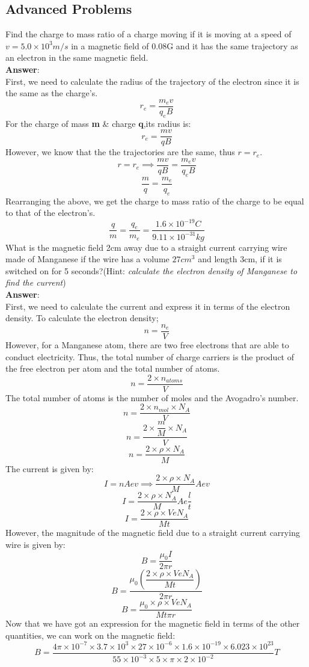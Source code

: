 \documentclass[9pt,addpoints]{exam}
\begin{document}
\begin{questions}
		\subsection*{Advanced Problems}
		\question Find the charge to mass ratio of a charge moving if it is moving at a speed of $v = 5.0\times10^3 m/s$ in a magnetic field of 0.08G and it has the same trajectory as an electron in the same magnetic field. \\ \textbf{Answer}: \\
		First, we need to calculate the radius of the trajectory of the electron since it is the same as the charge's.
		$$r_e=\dfrac{m_ev}{q_eB}$$
		For the charge of mass \textbf{m} \& charge \textbf{q},its radius is:
		$$r_e=\dfrac{mv}{qB}$$
		However, we know that the the trajectories are the same, thus $r=r_e$.
		$$r=r_e\implies\dfrac{mv}{qB}=\dfrac{m_ev}{q_eB}$$
		$$\dfrac{m}{q}=\dfrac{m_e}{q_e}$$
		Rearranging the above, we get the charge to mass ratio of the charge to be equal to that of the electron's.
		$$\dfrac{q}{m}=\dfrac{q_e}{m_e}=\dfrac{1.6\times10^{-19}C}{9.11\times10^{-31}kg}$$
		\question What is the magnetic field 2cm away due to a straight current carrying wire made of Manganese if the wire has a volume $27cm^3$ and length 3cm, if it is switched on for 5 seconds?(Hint: \textit{calculate the electron density of Manganese to find the current})\\ \textbf{Answer}: \\
		First, we need to calculate the current and express it in terms of the electron density. To calculate the electron density;
		$$n=\dfrac{n_e}{V}$$
		However, for a Manganese atom, there are two free electrons that are able to conduct electricity. Thus, the total number of charge carriers is the product of the free electron per atom and the total number of atoms.
		$$n=\dfrac{2\times n_{atoms}}{V}$$
		The total number of atoms is the number of moles and the Avogadro's number.
		$$n=\dfrac{2\times n_{mol}\times N_{A}}{V}$$
		$$n=\dfrac{2\times\dfrac{m}{M}\times N_{A}}{V}$$	
		$$n=\dfrac{2\times\rho\times N_{A}}{M}$$
		The current is given by:
		$$I=nAev\implies\dfrac{2\times\rho\times N_{A}}{M}Aev$$
		$$I=\dfrac{2\times\rho\times N_{A}}{M}Ae\dfrac{l}{t}$$
		$$I=\dfrac{2\times\rho\times V e N_{A}}{M t}$$
		However, the magnitude of the magnetic field due to a straight current carrying wire is given by:
		$$B=\dfrac{\mu_0I}{2\pi r}$$
		$$B=\dfrac{\mu_0(\dfrac{2\times\rho\times V e N_{A}}{M t})}{2\pi r}$$
		$$B=\dfrac{\mu_0\times\rho\times V e N_{A}}{M t\pi r}$$
		Now that we have got an expression for the magnetic field in terms of the other quantities, we can work on the magnetic field:
		$$B=\dfrac{4\pi\times10^{-7}\times3.7\times10^{3}\times27\times10^{-6}\times1.6\times10^{-19}\times6.023\times10^{23}}{55\times10^{-3} \times5\times\pi\times2\times10^{-2}}T$$
	\end{questions}		
\end{document}
